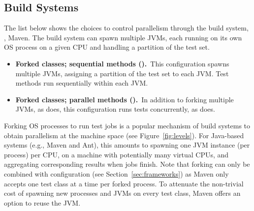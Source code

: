 \subsection{Build Systems}
\label{sec:builder}

The list below shows the choices to control parallelism through the
build system, \eg{}, Maven.  The build system can spawn multiple JVMs,
each running on its own OS process on a given CPU and handling a
partition of the test set.

\begin{itemize}
\item
    \textbf{Forked classes; sequential methods (\ForkSeq).}~This
    configuration spawns multiple JVMs, assigning a partition of the
    test set to each JVM.  Test methods run sequentially within each
    JVM.
\item
    \textbf{Forked classes; parallel methods (\ForkParMeth).}~In
    addition to forking multiple JVMs, as \ForkSeq{} does, this
    configuration runs tests concurrently, as \SeqClassParMeth{} does.
\end{itemize}


Forking OS processes to run test jobs is a popular mechanism of build
systems to obtain parallelism at the machine space (see
Figure~\ref{fig:levels}).  For Java-based systems (e.g., Maven and
Ant), this amounts to spawning one JVM instance (per process) per CPU,
on a machine with potentially many virtual CPUs, and aggregating
corresponding results when jobs finish.  Note that forking can only be
combined with configuration \SeqClassParMeth{} (see
Section~\ref{sec:frameworks}) as Maven only accepts one test class at
a time per forked process.  To attenuate the non-trivial cost of
spawning new processes and JVMs on every test class, Maven offers an
option to reuse the JVM.


